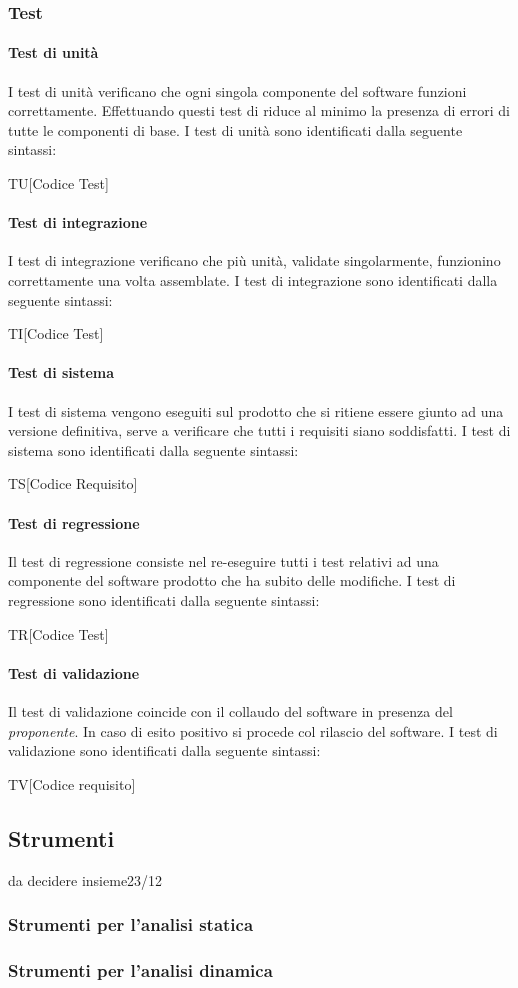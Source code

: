 \subsubsection{Test}
\paragraph{Test di unità}
I test di unità verificano che ogni singola componente del software funzioni 
correttamente. Effettuando questi test di riduce al minimo la presenza di errori 
di tutte le componenti di base. I test di unità sono identificati dalla seguente 
sintassi:
\begin{center}
  TU[Codice Test]
\end{center}
\paragraph{Test di integrazione}
I test di integrazione verificano che più unità, validate singolarmente, funzionino 
correttamente una volta assemblate. I test di integrazione sono identificati 
dalla seguente sintassi:
\begin{center}
  TI[Codice Test]
\end{center}
\paragraph{Test di sistema}
I test di sistema vengono eseguiti sul prodotto che si ritiene essere giunto ad 
una versione definitiva, serve a verificare che tutti i requisiti siano 
soddisfatti. I test di sistema sono identificati dalla seguente sintassi:
\begin{center}
  TS[Codice Requisito]
\end{center}
\paragraph{Test di regressione}
Il test di regressione consiste nel re-eseguire tutti i test relativi ad una 
componente del software prodotto che ha subito delle modifiche. I test di 
regressione sono identificati dalla seguente sintassi:
\begin{center}
  TR[Codice Test]
\end{center}
\paragraph{Test di validazione}
Il test di validazione coincide con il collaudo del software in presenza del 
\textit{proponente}. In caso di esito positivo si procede col rilascio del 
software. I test di validazione sono identificati dalla seguente sintassi:
\begin{center}
  TV[Codice requisito]
\end{center}

\subsection{Strumenti}
da decidere insieme23/12
\subsubsection{Strumenti per l'analisi statica}

\subsubsection{Strumenti per l'analisi dinamica}



